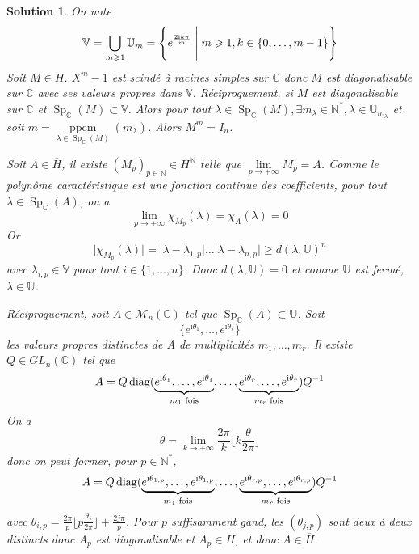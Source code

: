 \documentclass[12pt]{article}
\newtheorem{solution}{Solution}[section]
\theoremstyle{remark}
\newcommand{\C}{\mathbb{C}} \newcommand{\Q}{\mathbb{Q}}
\newcommand{\N}{\mathbb{N}} \newcommand{\Z}{\mathbb{Z}}
\newcommand{\U}{\mathbb{U}} \newcommand{\E}{\mathbb{E}}
\newcommand{\M}{\mathcal{M}} \renewcommand{\L}{\mathcal{L}}
\DeclareMathOperator{\Sp}{Sp} \DeclareMathOperator{\mat}{mat}
\DeclareMathOperator{\ppcm}{ppcm}
\numberwithin{equation}{section}
\begin{document}
\begin{solution}
	On note 
	$$\mathbb{V}=\bigcup_{m\geqslant1}\U_{m}=\Biggl\{e^{\frac{2\mathrm{i}k\pi}{m}}\Biggm| m\geqslant1,k\in\{0,\dots,m-1\}\Biggr\}$$
	Soit $M\in H$. $X^{m}-1$ est scindé à racines simples sur $\C$ donc $M$ est diagonalisable sur $\C$ avec ses valeurs propres dans $\mathbb{V}$. Réciproquement, si $M$ est diagonalisable sur $\C$ et $\Sp_{\C}(M)\subset\mathbb{V}$. Alors pour tout $\lambda\in\Sp_{\C}(M),\exists m_{\lambda}\in\N^{*},\lambda\in\U_{m_{\lambda}}$ et soit $m=\ppcm\limits_{\lambda\in\Sp_{\C}(M)}(m_{\lambda})$. Alors $M^{m}=I_{n}$.

	Soit $A\in\overline{H}$, il existe $(M_{p})_{p\in\N}\in H^{\N}$ telle que $\lim\limits_{p\to+\infty}M_{p}=A$. Comme le polynôme caractéristique est une fonction continue des coefficients, pour tout $\lambda\in\Sp_{\C}(A)$, on a 
	$$\lim\limits_{p\to+\infty}\chi_{M_{p}}(\lambda)=\chi_{A}(\lambda)=0$$
	Or 
	$$\vert\chi_{M_{p}}(\lambda)\vert=\vert\lambda-\lambda_{1,p}\vert\dots\vert\lambda-\lambda_{n,p}\vert\geqslant d(\lambda,\U)^{n}$$
	avec $\lambda_{i,p}\in\mathbb{V}$ pour tout $i\in\{1,\dots,n\}$. Donc $d(\lambda,\U)=0$ et comme $\U$ est fermé, $\lambda\in\U$.

	Réciproquement, soit $A\in\M_{n}(\C)$ tel que $\Sp_{\C}(A)\subset\U$. Soit 
	$$\bigl\{e^{\mathrm{i}\theta_1},\dots,e^{\mathrm{i}\theta_r}\bigr\}$$
	les valeurs propres distinctes de $A$ de multiplicités $m_{1},\dots,m_{r}$. Il existe $Q\in GL_{n}(\C)$ tel que 
	$$A=Q\operatorname{diag}(\underbrace{e^{\mathrm{i}\theta_{1}},\dots,e^{\mathrm{i}\theta_1}}_{m_{1}\text{ fois}},\dots,\underbrace{e^{\mathrm{i}\theta_r},\dots,e^{\mathrm{i}\theta_r}}_{m_{r}\text{ fois}})Q^{-1}$$
	On a 
	$$\theta=\lim\limits_{k\to+\infty}\frac{2\pi}{k}\lfloor k\frac{\theta}{2\pi}\rfloor$$
	donc on peut former, pour $p\in\N^{*}$,
	$$A=Q\operatorname{diag}(\underbrace{e^{\mathrm{i}\theta_{1,p}},\dots,e^{\mathrm{i}\theta_{1,p}}}_{m_{1}\text{ fois}},\dots,\underbrace{e^{\mathrm{i}\theta_{r,p}},\dots,e^{\mathrm{i}\theta_{r,p}}}_{m_{r}\text{ fois}})Q^{-1}$$
	avec $\theta_{i,p}=\frac{2\pi}{p}\lfloor p\frac{\theta_{j}}{2\pi}\rfloor+\frac{2 j\pi}{p}$. Pour $p$ suffisamment gand, les $(\theta_{j,p})$ sont deux à deux distincts donc $A_{p}$ est diagonalisable et $A_{p}\in H$, et donc $A\in \overline{H}$.
\end{solution}
\end{document}
